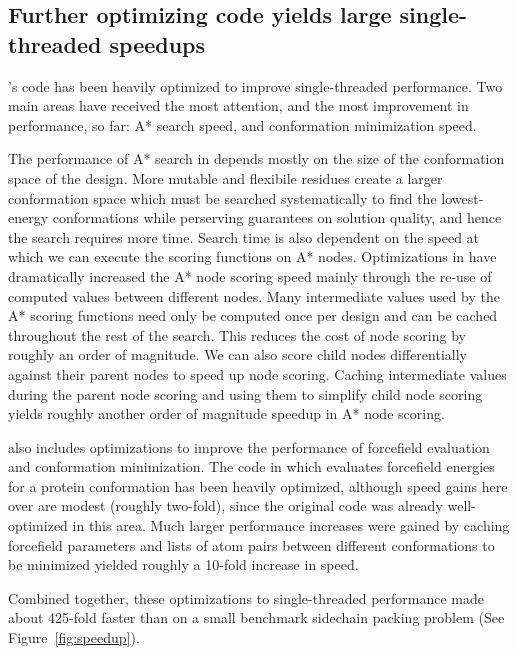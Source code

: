 
\subsection{Further optimizing code yields large single-threaded speedups}

's code has been heavily optimized to improve single-threaded performance. Two main areas have received the most attention, and the most improvement in performance, so far: A* search speed, and conformation minimization speed.

The performance of A* search in \osprey depends mostly on the size of the conformation space of the design. More mutable and flexibile residues create a larger conformation space which must be searched systematically to find the lowest-energy conformations while perserving guarantees on solution quality, and hence the search requires more time. Search time is also dependent on the speed at which we can execute the scoring functions on A* nodes. Optimizations in  have dramatically increased the A* node scoring speed mainly through the re-use of computed values between different nodes. Many intermediate values used by the A* scoring functions need only be computed once per design and can be cached throughout the rest of the search. This reduces the cost of node scoring by roughly an order of magnitude. We can also score child nodes differentially against their parent nodes to speed up node scoring. Caching intermediate values during the parent node scoring and using them to simplify child node scoring yields roughly another order of magnitude speedup in A* node scoring. 

 also includes optimizations to improve the performance of forcefield evaluation and conformation minimization. The code in  which evaluates forcefield energies for a protein conformation has been heavily optimized, although speed gains here over  are modest (roughly two-fold), since the original code was already well-optimized in this area. Much larger performance increases were gained by caching forcefield parameters and lists of atom pairs between different conformations to be minimized yielded roughly a 10-fold increase in speed. 

Combined together, these optimizations to single-threaded performance made  about 425-fold faster than  on a small benchmark sidechain packing problem (See Figure~\ref{fig:speedup}).


